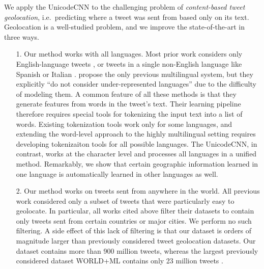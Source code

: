 \documentclass[sigconf,anonymous,review]{acmart}
\newcommand{\defn}[1]{\textit{#1}}
\begin{document}
We apply the UnicodeCNN to the challenging problem of \defn{content-based tweet geolocation},
i.e.\ predicting where a tweet was sent from based only on its text.
Geolocation is a well-studied problem,
and we improve the state-of-the-art in three ways.
\begin{enumerate}
    \item[1.]
        Our method works with all languages.
Most prior work considers only English-language tweets \citep{cheng2010you,li2012towards,han2013stacking,mahmud2014home,compton2014geotagging,zhang2014geocoding,rahimi2015twitter,dredze2016geolocation,duong2016near,rahimi2017neural},
or tweets in a single non-English language like Spanish \citep{maier2014language,gonccalves2015learning,tinoco2017variation} or Italian \citep{paraskevopoulos2015fine}.
\citet{han2014text} propose the only previous multilingual system, 
but they explicitly ``do not consider under-represented languages'' due to the difficulty of modeling them.
A common feature of all these methods is that they generate features from words in the tweet's text.
Their learning pipeline therefore requires special tools for tokenizing the input text into a list of words.
Existing tokenization tools work only for some languages,
and extending the word-level approach to the highly multilingual setting requires developing tokenizaiton tools for all possible languages.
The UnicodeCNN, in contrast, works at the character level and processes all languages in a unified method.
Remarkably, we show that certain geographic information learned in one language is automatically learned in other languages as well.

\item[2.]
    Our method works on tweets sent from anywhere in the world.
All previous work considered only a subset of tweets that were particularly easy to geolocate.
In particular, all works cited above filter their datasets to contain only tweets sent from certain countries or major cities.
We perform no such filtering.
A side effect of this lack of filtering is that our dataset is orders of magnitude larger than previously considered tweet geolocation datasets. 
Our dataset contains more than 900 million tweets,
whereas the largest previously considered dataset WORLD+ML contains only 23 million tweets \citep{han2014text}.


\end{enumerate}
\end{document}
